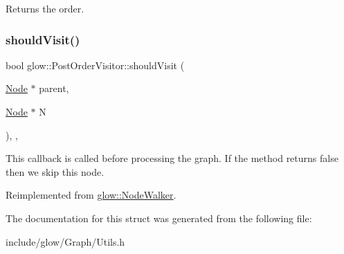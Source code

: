 \begin{DoxyReturn}{Returns}
the order. 
\end{DoxyReturn}
\mbox{\label{structglow_1_1_post_order_visitor_aac9bad1f6f91fb1f9328061e4a4fce68}} 
\subsubsection{\texorpdfstring{should\+Visit()}{shouldVisit()}}
{\footnotesize\ttfamily bool glow\+::\+Post\+Order\+Visitor\+::should\+Visit (\begin{DoxyParamCaption}\item[{\hyperlink{classglow_1_1_node}{Node} $\ast$}]{parent,  }\item[{\hyperlink{classglow_1_1_node}{Node} $\ast$}]{N }\end{DoxyParamCaption})\hspace{0.3cm}{\ttfamily [inline]}, {\ttfamily [override]}, {\ttfamily [virtual]}}

This callback is called before processing the graph. If the method returns false then we skip this node. 

Reimplemented from \hyperlink{classglow_1_1_node_walker_a33532d7a4fe24f71c1b763c53182b20b}{glow\+::\+Node\+Walker}.



The documentation for this struct was generated from the following file\+:\begin{DoxyCompactItemize}
\item 
include/glow/\+Graph/Utils.\+h\end{DoxyCompactItemize}

